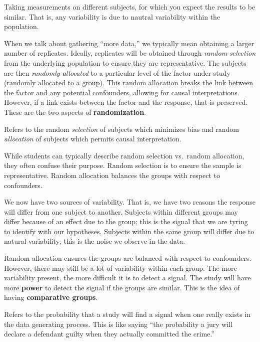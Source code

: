 \documentclass[]{book}
\theoremstyle{plain}
\theoremstyle{mydefn}
\theoremstyle{myexmpl}
\theoremstyle{remark}
\let\BeginKnitrBlock\begin \let\EndKnitrBlock\end
\let\BeginKnitrBlock\begin \let\EndKnitrBlock\end
\begin{document}
\BeginKnitrBlock{definition}[Replication]
\protect\hypertarget{def:defn-replication}{}{\label{def:defn-replication}
{} }Taking measurements on different subjects,
for which you expect the results to be similar. That is, any variability
is due to nautral variability within the population.
\EndKnitrBlock{definition}

When we talk about gathering ``more data,'' we typically mean obtaining
a larger number of replicates. Ideally, replicates will be obtained
through \emph{random selection} from the underlying population to ensure
they are representative. The subjects are then \emph{randomly allocated}
to a particular level of the factor under study (randomly allocated to a
group). This random allocation breaks the link between the factor and
any potential confounders, allowing for causal interpretations. However,
if a link exists between the factor and the response, that is preserved.
These are the two aspects of \textbf{randomization}.

\BeginKnitrBlock{definition}[Randomization]
\protect\hypertarget{def:defn-randomization}{}{\label{def:defn-randomization}
{} }Refers to the random \emph{selection} of
subjects which minimizes bias and random \emph{allocation} of subjects
which permits causal interpretation.
\EndKnitrBlock{definition}

\BeginKnitrBlock{rmdtip}
While students can typically describe random selection vs.~random
allocation, they often confuse their purpose. Random selection is to
ensure the sample is representative. Random allocation balances the
groups with respect to confounders.
\EndKnitrBlock{rmdtip}

We now have two sources of variability. That is, we have two reasons the
response will differ from one subject to another. Subjects within
different groups may differ because of an effect due to the group; this
is the signal that we are tyring to identify with our hypotheses.
Subjects within the same group will differ due to natural variability;
this is the noise we observe in the data.

Random allocation ensures the groups are balanced with respect to
confounders. However, there may still be a lot of variability within
each group. The more variability present, the more difficult it is to
detect a signal. The study will have more \textbf{power} to detect the
signal if the groups are similar. This is the idea of having
\textbf{comparative groups}.

\BeginKnitrBlock{definition}[Power]
\protect\hypertarget{def:defn-power}{}{\label{def:defn-power}
{} }Refers to the probability that a study will find
a signal when one really exists in the data generating process. This is
like saying ``the probability a jury will declare a defendant guilty
when they actually committed the crime.''
\EndKnitrBlock{definition}
\end{document}
